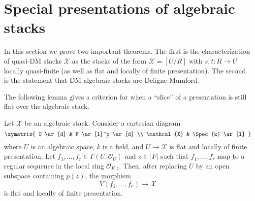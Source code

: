 \section{Special presentations of algebraic stacks}
\label{section-presentations}

\noindent
In this section we prove two important theorems.
The first is the characterization of quasi-DM stacks $\mathcal{X}$
as the stacks of the form $\mathcal{X} = [U/R]$ with $s, t : R \to U$ locally
quasi-finite (as well as flat and locally of finite presentation).
The second is the statement that DM algebraic stacks are Deligne-Mumford.

\medskip\noindent
The following lemma gives a criterion for when a ``slice''
of a presentation is still flat over the algebraic stack.

\begin{lemma}
\label{lemma-slice}
Let $\mathcal{X}$ be an algebraic stack.
Consider a cartesian diagram
$$
\xymatrix{
U \ar[d] & F \ar[l]^p \ar[d] \\
\mathcal{X} & \Spec(k) \ar[l]
}
$$
where $U$ is an algebraic space, $k$ is a field, and $U \to \mathcal{X}$
is flat and locally of finite presentation. Let
$f_1, \ldots, f_r \in \Gamma(U, \mathcal{O}_U)$
and $z \in |F|$ such that $f_1, \ldots, f_r$ map to a regular sequence
in the local ring $\mathcal{O}_{F, \overline{z}}$.
Then, after replacing $U$ by an open subspace containing $p(z)$, the morphism
$$
V(f_1, \ldots, f_r) \longrightarrow \mathcal{X}
$$
is flat and locally of finite presentation.
\end{lemma}

